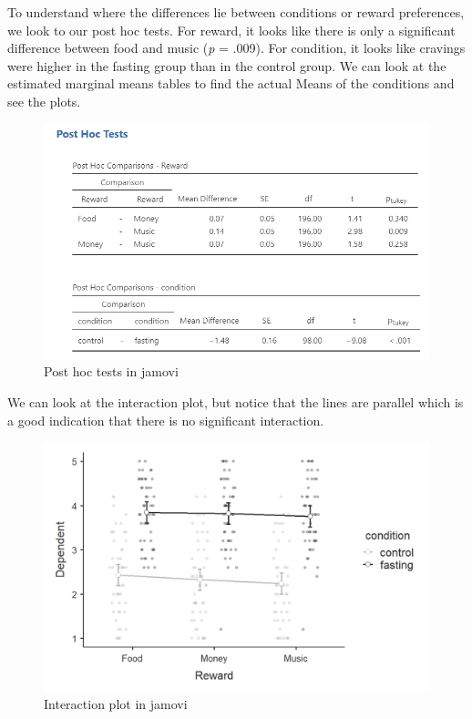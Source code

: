\documentclass[
]{book}
\begin{document}
To understand where the differences lie between conditions or reward preferences, we look to our post hoc tests. For reward, it looks like there is only a significant difference between food and music (\emph{p} = .009). For condition, it looks like cravings were higher in the fasting group than in the control group. We can look at the estimated marginal means tables to find the actual Means of the conditions and see the plots.

\begin{figure}

{\centering \includegraphics[width=1\linewidth]{images/06-factorial-anova/mixed_posthoc} 

}

\caption{Post hoc tests in jamovi}\label{fig:unnamed-chunk-11}
\end{figure}

We can look at the interaction plot, but notice that the lines are parallel which is a good indication that there is no significant interaction.

\begin{figure}

{\centering \includegraphics[width=1\linewidth]{images/06-factorial-anova/mixed_interaction} 

}

\caption{Interaction plot in jamovi}\label{fig:unnamed-chunk-12}
\end{figure}
\end{document}
